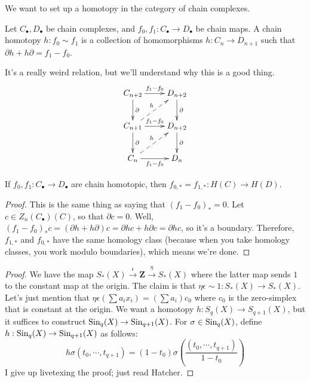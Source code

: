 We want to set up a homotopy in the category of chain complexes.
\begin{definition}
Let $C_\bullet,D_\bullet$ be chain complexes, and $f_0,f_1:C_\bullet\to D_\bullet$ be chain maps. A chain homotopy $h:f_0\sim f_1$ is a collection of homomorphisms $h:C_n\to D_{n+1}$ such that $\partial h+h\partial=f_1-f_0$.
\end{definition}
It's a really weird relation, but we'll understand why this is a good thing.
\begin{equation*}
\xymatrix{C_{n+2}\ar[r]^{f_1-f_0}\ar[d]^\partial & D_{n+2}\ar[d]^\partial\\
C_{n+1}\ar@{-->}[ur]^h\ar[r]^{f_1-f_0}\ar[d]^\partial & D_{n+2}\ar[d]^\partial\\
C_n\ar@{-->}[ur]^h\ar[r]_{f_1-f_0} & D_n}
\end{equation*}
\begin{lemma}
If $f_0,f_1:C_\bullet\to D_\bullet$ are chain homotopic, then $f_{0,\ast}=f_{1,\ast}: H(C)\to H(D)$.
\end{lemma}
\begin{proof}
This is the same thing as saying that $(f_1-f_0)_\ast=0$. Let $c\in Z_n(C_\bullet)(C)$, so that $\partial c=0$. Well, $(f_1-f_0)_\ast c=(\partial h+h\partial)c=\partial hc+h\partial c=\partial hc$, so it's a boundary. Therefore, $f_{1,\ast}$ and $f_{0,\ast}$ have the same homology class (because when you take homology classes, you work modulo boundaries), which means we're done.
\end{proof}
\begin{proof}
We have the map $S_\ast(X)\xrightarrow{\epsilon}\mathbf{Z}\xrightarrow{\eta}S_\ast(X)$ where the latter map sends $1$ to the constant map at the origin. The claim is that $\eta\epsilon\sim 1:S_\ast(X)\to S_\ast(X)$. Let's just mention that $\eta\epsilon(\sum a_ix_i)=(\sum a_i)c_0$ where $c_0$ is the zero-simplex that is constant at the origin. We want a homotopy $h:S_q(X)\to S_{q+1}(X)$, but it suffices to construct $\mathrm{Sin}_q(X)\to \mathrm{Sin}_{q+1}(X)$. For $\sigma\in\mathrm{Sin}_q(X)$, define $h:\mathrm{Sin}_q(X)\to\mathrm{Sin}_{q+1}(X)$ as follows:
$$h\sigma(t_0,\cdots,t_{q+1})=(1-t_0)\sigma\left(\frac{(t_0,\cdots,t_{q+1})}{1-t_0}\right)$$
I give up livetexing the proof; just read Hatcher.
\end{proof}
